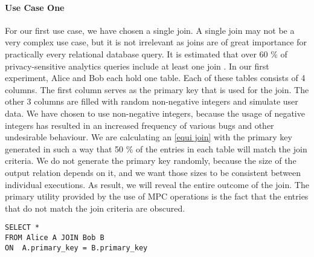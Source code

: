 \paragraph{Use Case One}
For our first use case, we have chosen a single join. A single join may not be a very complex use case, but it is not irrelevant as joins are of great importance for practically every relational database query. It is estimated that over 60 \% of privacy-sensitive analytics queries include at least one join \cite{johnson2017practical}. In our first experiment, Alice and Bob each hold one table. Each of these tables consists of 4 columns. The first column serves as the primary key that is used for the join. The other 3 columns are filled with random non-negative integers and simulate user data. We have chosen to use non-negative integers, because the usage of negative integers has resulted in an  increased frequency of various bugs and other undesirable behaviour. We are calculating an \hyperref[Databases]{[equi join]}  with the primary key generated in such a way that 50 \% of the entries in each table will match the join criteria. We do not generate the primary key randomly, because the size of the output relation depends on it, and we want those sizes to be consistent between individual executions. As result, we will reveal the entire outcome of the join. The primary utility provided by the use of MPC operations is the fact that the entries that do not match the join criteria are obscured.

\label{SQL1_label}				
\begin{lstlisting}[caption={ Functional equivalent SQL statement for our first use case  }]
SELECT * 
FROM Alice A JOIN Bob B 
ON  A.primary_key = B.primary_key
\end{lstlisting}
\label{SQL1}
	\label{Use Case two}		
